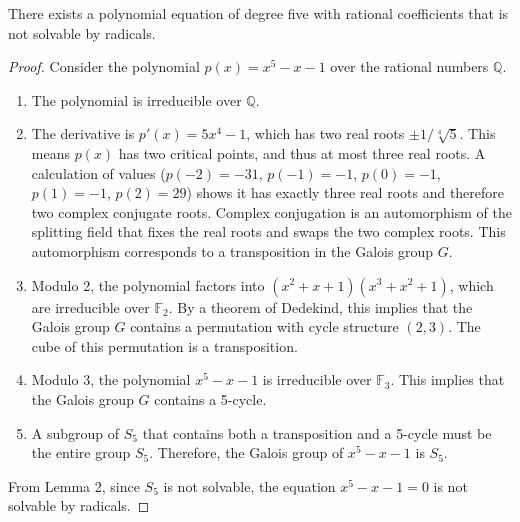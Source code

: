 \begin{theorem}
There exists a polynomial equation of degree five with rational coefficients that is not solvable by radicals.
\end{theorem}

\begin{proof}
Consider the polynomial $p(x) = x^5 - x - 1$ over the rational numbers $\mathbb{Q}$.
\begin{enumerate}
    \item The polynomial is irreducible over $\mathbb{Q}$.
    \item The derivative is $p'(x) = 5x^4 - 1$, which has two real roots $\pm 1/\sqrt[4]{5}$. This means $p(x)$ has two critical points, and thus at most three real roots. A calculation of values ($p(-2) = -31$, $p(-1)= -1$, $p(0)=-1$, $p(1)=-1$, $p(2)=29$) shows it has exactly three real roots and therefore two complex conjugate roots. Complex conjugation is an automorphism of the splitting field that fixes the real roots and swaps the two complex roots. This automorphism corresponds to a transposition in the Galois group $G$.
    \item Modulo 2, the polynomial factors into $(x^2+x+1)(x^3+x^2+1)$, which are irreducible over $\mathbb{F}_2$. By a theorem of Dedekind, this implies that the Galois group $G$ contains a permutation with cycle structure $(2,3)$. The cube of this permutation is a transposition.
    \item Modulo 3, the polynomial $x^5 - x - 1$ is irreducible over $\mathbb{F}_3$. This implies that the Galois group $G$ contains a 5-cycle.
    \item A subgroup of $S_5$ that contains both a transposition and a 5-cycle must be the entire group $S_5$. Therefore, the Galois group of $x^5 - x - 1$ is $S_5$.
\end{enumerate}
From Lemma 2, since $S_5$ is not solvable, the equation $x^5 - x - 1 = 0$ is not solvable by radicals.
\end{proof}
